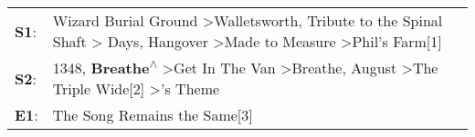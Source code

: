 \begin{supertabular}{p{0.03\textwidth}p{0.92\textwidth}}
 \textbf{S1}:  &  Wizard Burial Ground\textsuperscript{} \textgreater \enspace Walletsworth\textsuperscript{}, \enspace Tribute to the Spinal Shaft\textsuperscript{} \textgreater {} Days\textsuperscript{}, \enspace Hangover\textsuperscript{} \textgreater \enspace Made to Measure\textsuperscript{} \textgreater \enspace Phil's Farm[1]\textsuperscript{}  \enspace  \\
 \textbf{S2}:  &                      1348\textsuperscript{}, \enspace \textbf{Breathe\textsuperscript{$\wedge$}} \textgreater \enspace Get In The Van\textsuperscript{} \textgreater \enspace Breathe\textsuperscript{}, \enspace August\textsuperscript{} \textgreater \enspace The Triple Wide[2]\textsuperscript{} \textgreater {}'s Theme\textsuperscript{}  \enspace  \\
 \textbf{E1}:  &                                                                                                                                                                                                                                                                                                           The Song Remains the Same[3]\textsuperscript{}  \enspace  \\
\end{supertabular}
